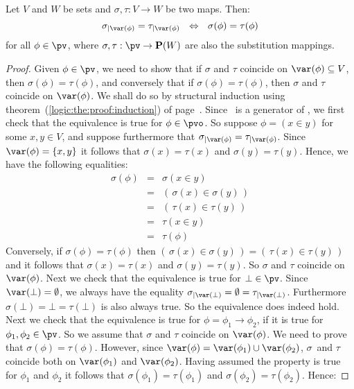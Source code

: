 \begin{prop}\label{logic:prop:substitution:support}
Let $V$ and $W$ be sets and $\sigma,\tau:V\to W$ be two maps. Then:
    \[
    \sigma_{|\var(\phi)}=\tau_{|\var(\phi)}\ \ \Leftrightarrow\
    \ \sigma(\phi)=\tau(\phi)
    \]
for all $\phi\in\pv$, where $\sigma,\tau:\pv\to{\bf P}(W)$ are also
the substitution mappings.
\end{prop}
\begin{proof}
Given $\phi\in\pv$, we need to show that if $\sigma$ and $\tau$
coincide on $\var(\phi)\subseteq V$, then $\sigma(\phi)=\tau(\phi)$,
and conversely that if $\sigma(\phi)=\tau(\phi)$, then $\sigma$ and
$\tau$ coincide on $\var(\phi)$. We shall do so by structural
induction using theorem~(\ref{logic:the:proof:induction}) of
page~\pageref{logic:the:proof:induction}. Since \pvo\ is a generator
of \pv, we first check that the equivalence is true for
$\phi\in\pvo$. So suppose $\phi=(x\in y)$ for some $x,y\in V$, and
suppose furthermore that $\sigma_{|\var(\phi)}=\tau_{|\var(\phi)}$.
Since $\var(\phi)=\{x,y\}$ it follows that $\sigma(x)=\tau(x)$ and
$\sigma(y)=\tau(y)$. Hence, we have the following equalities:
    \begin{eqnarray*}
    \sigma(\phi)&=&\sigma(x\in y)\\
    &=&(\,\sigma(x)\in\sigma(y)\,)\\
    &=&(\,\tau(x)\in\tau(y)\,)\\
    &=&\tau(x\in y)\\
    &=&\tau(\phi)
    \end{eqnarray*}
Conversely, if $\sigma(\phi)=\tau(\phi)$ then
$(\,\sigma(x)\in\sigma(y)\,)=(\,\tau(x)\in\tau(y)\,)$ and it follows
that $\sigma(x)=\tau(x)$ and $\sigma(y)=\tau(y)$. So $\sigma$ and
$\tau$ coincide on $\var(\phi)$. Next we check that the equivalence
is true for $\bot\in\pv$. Since $\var(\bot)=\emptyset$, we always
have the equality
$\sigma_{|\var(\bot)}=\emptyset=\tau_{|\var(\bot)}$. Furthermore
$\sigma(\bot)=\bot=\tau(\bot)$ is also always true. So the
equivalence does indeed hold. Next we check that the equivalence is
true for $\phi=\phi_{1}\to\phi_{2}$, if it is true for
$\phi_{1},\phi_{2}\in\pv$. So we assume that $\sigma$ and $\tau$
coincide on $\var(\phi)$. We need to prove that
$\sigma(\phi)=\tau(\phi)$. However, since
$\var(\phi)=\var(\phi_{1})\cup\var(\phi_{2})$, $\sigma$~and $\tau$
coincide both on $\var(\phi_{1})$ and $\var(\phi_{2})$. Having
assumed the property is true for $\phi_{1}$ and $\phi_{2}$ it
follows that $\sigma(\phi_{1})=\tau(\phi_{1})$ and
$\sigma(\phi_{2})=\tau(\phi_{2})$. Hence:

\end{proof}
